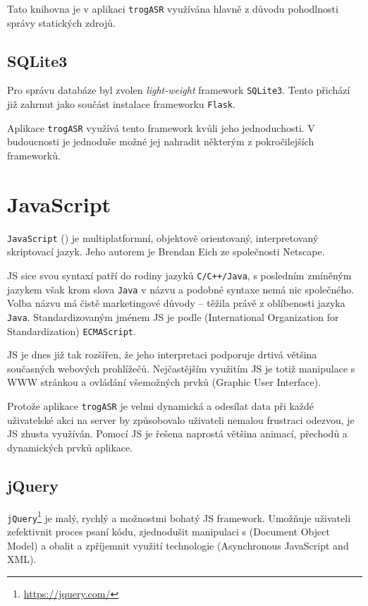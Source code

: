 Tato knihovna je v aplikaci \verb|trogASR| využívána hlavně z důvodu pohodlnosti správy statických zdrojů.

\subsection{SQLite3}

Pro správu databáze byl zvolen {\sl light-weight} framework \verb|SQLite3|. Tento přichází již zahrnut jako součást instalace frameworku \verb|Flask|.

Aplikace \verb|trogASR| využívá tento framework kvůli jeho jednoduchosti. V budoucnosti je jednoduše možné jej nahradit některým z pokročilejších frameworků.

\section{JavaScript}

\verb|JavaScript| () je multiplatformní, objektově orientovaný, interpretovaný skriptovací jazyk. Jeho autorem je Brendan Eich ze společnosti Netscape.

JS sice svou syntaxí patří do rodiny jazyků \verb|C/C++/Java|, s posledním zmíněným jazykem však krom slova \verb|Java| v názvu a podobné syntaxe nemá nic společného. Volba názvu má čistě marketingové důvody -- těžila právě z oblíbenosti jazyka \verb|Java|. Standardizovaným jménem JS je podle  (International Organization for Standardization) \verb|ECMAScript|.

JS je dnes již tak rozšířen, že jeho interpretaci podporuje drtivá většina současných webových prohlížečů. Nejčastějším využitím JS je totiž manipulace s WWW stránkou a ovládání všemožných prvků  (Graphic User Interface).

Protože aplikace \verb|trogASR| je velmi dynamická a odesílat data při každé uživatelské akci na server by způsobovalo uživateli nemalou frustraci odezvou, je JS zhusta využíván. Pomocí JS je řešena naprostá většina animací, přechodů a dynamických prvků aplikace.

\subsection{jQuery}

\verb|jQuery|\footnote{\url{https://jquery.com/}} je malý, rychlý a možnostmi bohatý JS framework. Umožňuje uživateli zefektivnit proces psaní kódu, zjednodušit manipulaci s  (Document Object Model) a obalit a zpříjemnit využití technologie  (Asynchronous JavaScript and XML).


